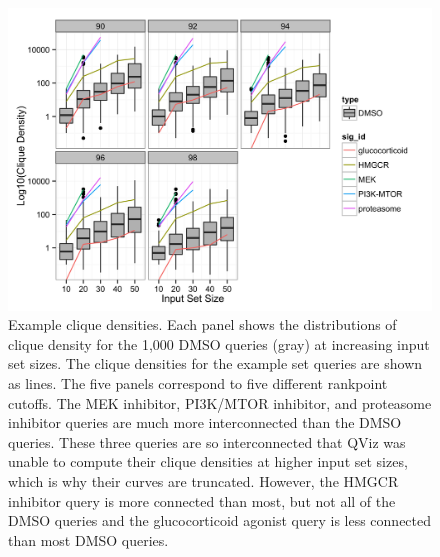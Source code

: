 \documentclass[12pt]{article}
\begin{document}
\begin{figure}[h]
\centering
\includegraphics[scale=0.25]{img/null_clique_scatter.png}
\caption{Example clique densities. Each panel shows the distributions of clique density for the 1,000 DMSO queries (gray) at increasing input set sizes. The clique densities for the example set queries are shown as lines. The five panels correspond to five different rankpoint cutoffs. The MEK inhibitor, PI3K/MTOR inhibitor, and proteasome inhibitor queries are much more interconnected than the DMSO queries. These three queries are so interconnected that QViz was unable to compute their clique densities at higher input set sizes, which is why their curves are truncated. However, the HMGCR inhibitor query is more connected than most, but not all of the DMSO queries and the glucocorticoid agonist query is less connected than most DMSO queries.}
\label{fig:null_clique_scatter}
\end{figure}
\end{document}
